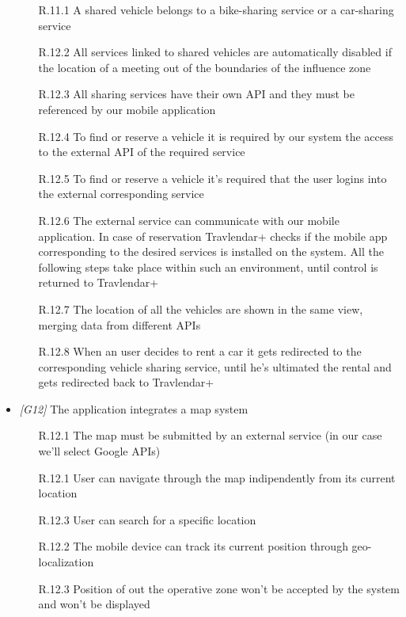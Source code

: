 \begin{itemize}
                   \begin{itemize}
                        \item [R.11.1] A shared vehicle belongs to a bike-sharing service or a car-sharing service
                        \item [R.12.2] All services linked to shared vehicles are automatically disabled if the location of a meeting out of the boundaries of the influence zone
                        \item [R.12.3] All sharing services have their own API and they must be referenced by our mobile application
                        \item [R.12.4] To find or reserve a vehicle it is required by our system the access to the external API of the required service
                        \item [R.12.5] To find or reserve a vehicle it's required that the user logins into the external corresponding service
                        \item [R.12.6] The external service can communicate with our mobile application. In case of reservation Travlendar+ checks if the mobile app corresponding to the desired services is installed on the system. All the following steps take place within such an environment, until control is returned to Travlendar+
                        \item [R.12.7] The location of all the vehicles are shown in the same view, merging data from different APIs
                        \item [R.12.8] When an user decides to rent a car it gets redirected to the corresponding vehicle sharing service, until he's ultimated the rental and gets redirected back to Travlendar+
                        \end{itemize}

\item \textit{[G12]} The application integrates a map system
                   
                  \begin{itemize}
                        \item [R.12.1] The map must be submitted by an external service (in our case we'll select Google APIs)
                        \item [R.12.1] User can navigate through the map indipendently from its current location
                        \item [R.12.3] User can search for a specific location
                        \item [R.12.2] The mobile device can track its current position through geo-localization
                        \item [R.12.3] Position of out the operative zone won't be accepted by the system and won't be displayed
                   \end{itemize}


            \end{itemize}



    
